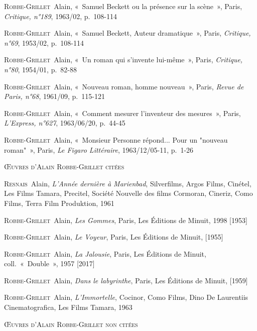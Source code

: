 \documentclass[12pt, a4paper]{article}
\begin{document}
    \textsc{Robbe-Grillet}~Alain, «~Samuel Beckett ou la présence sur la scène~», Paris, \textit{Critique, n°189}, 1963/02, p.~108-114\par
    \textsc{Robbe-Grillet}~Alain, «~Samuel Beckett, Auteur dramatique~», Paris, \textit{Critique, n°69}, 1953/02, p.~108-114\par
    \textsc{Robbe-Grillet}~Alain, «~Un roman qui s'invente lui-même~», Paris, \textit{Critique, n°80}, 1954/01, p.~82-88\par
    \textsc{Robbe-Grillet}~Alain, «~Nouveau roman, homme nouveau~», Paris, \textit{Revue de Paris, n°68}, 1961/09, p.~115-121\par
    \textsc{Robbe-Grillet}~Alain, «~Comment mesurer l'inventeur des mesures~», Paris, \textit{L'Express, n°627}, 1963/06/20, p.~44-45\par
    \textsc{Robbe-Grillet}~Alain, «~Monsieur Personne répond... Pour un "nouveau roman"~», Paris, \textit{Le Figaro Littéraire}, 1963/12/05-11, p.~1-26\par
    
        \vspace*{2cm}
        \setlength{\parindent}{0cm}
{\large\textsc{Œuvres d'Alain Robbe-Grillet citées}}
        \vspace*{1cm}
        \setlength{\parindent}{25pt}
        
        
        

        
        \textsc{Resnais}~Alain, \textit{L'Année dernière à Marienbad}, Silverfilms, Argos Films, Cinétel, Les Films Tamara, Precitel, Société Nouvelle des films Cormoran, Cineriz, Como Films, Terra Film Produktion, 1961\par 
    \textsc{Robbe-Grillet}~Alain, \textit{Les Gommes}, Paris, Les Éditions de Minuit, 1998 [1953]\par 
    \textsc{Robbe-Grillet}~Alain, \textit{Le Voyeur}, Paris, Les Éditions de Minuit,  [1955]\par 
    \textsc{Robbe-Grillet}~Alain, \textit{La Jalousie}, Paris, Les Éditions de Minuit, coll.~«~Double~», 1957 [2017]\par 
    \textsc{Robbe-Grillet}~Alain, \textit{Dans le labyrinthe}, Paris, Les Éditions de Minuit,  [1959]\par 
    \textsc{Robbe-Grillet}~Alain, \textit{L'Immortelle}, Cocinor, Como Films, Dino De Laurentiis Cinematografica, Les Films Tamara, 1963\par 
    
        \vspace*{2cm}
        \setlength{\parindent}{0cm}
{\large\textsc{Œuvres d'Alain Robbe-Grillet non citées}}
        \vspace*{1cm}
        \setlength{\parindent}{25pt}
        
\end{document}
